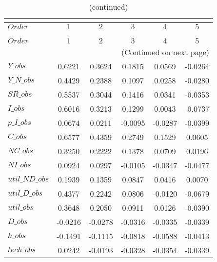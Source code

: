  
\begin{center}
\begin{longtable}{lccccc} 
\caption{COEFFICIENTS OF AUTOCORRELATION}\\
 \label{Table:th_autocorr_matrix}\\
\toprule 
$Order          $	 & 	 $          1$	 & 	 $          2$	 & 	 $          3$	 & 	 $          4$	 & 	 $          5$\\
\midrule \endfirsthead 
\caption{(continued)}\\
 \toprule \\ 
$Order          $	 & 	 $          1$	 & 	 $          2$	 & 	 $          3$	 & 	 $          4$	 & 	 $          5$\\
\midrule \endhead 
\midrule \multicolumn{6}{r}{(Continued on next page)} \\ \bottomrule \endfoot 
\bottomrule \endlastfoot 
$Y\_obs         $	 & 	     0.6221	 & 	     0.3624	 & 	     0.1815	 & 	     0.0569	 & 	    -0.0264 \\ 
$Y\_N\_obs      $	 & 	     0.4429	 & 	     0.2388	 & 	     0.1097	 & 	     0.0258	 & 	    -0.0280 \\ 
$SR\_obs        $	 & 	     0.5537	 & 	     0.3044	 & 	     0.1416	 & 	     0.0341	 & 	    -0.0353 \\ 
$I\_obs         $	 & 	     0.6016	 & 	     0.3213	 & 	     0.1299	 & 	     0.0043	 & 	    -0.0737 \\ 
$p\_I\_obs      $	 & 	     0.0674	 & 	     0.0211	 & 	    -0.0095	 & 	    -0.0287	 & 	    -0.0399 \\ 
$C\_obs         $	 & 	     0.6577	 & 	     0.4359	 & 	     0.2749	 & 	     0.1529	 & 	     0.0605 \\ 
$NC\_obs        $	 & 	     0.3250	 & 	     0.2222	 & 	     0.1378	 & 	     0.0709	 & 	     0.0196 \\ 
$NI\_obs        $	 & 	     0.0924	 & 	     0.0297	 & 	    -0.0105	 & 	    -0.0347	 & 	    -0.0477 \\ 
$util\_ND\_obs  $	 & 	     0.1939	 & 	     0.1359	 & 	     0.0847	 & 	     0.0416	 & 	     0.0070 \\ 
$util\_D\_obs   $	 & 	     0.4377	 & 	     0.2242	 & 	     0.0806	 & 	    -0.0120	 & 	    -0.0679 \\ 
$util\_obs      $	 & 	     0.3648	 & 	     0.2050	 & 	     0.0911	 & 	     0.0126	 & 	    -0.0390 \\ 
$D\_obs         $	 & 	    -0.0216	 & 	    -0.0278	 & 	    -0.0316	 & 	    -0.0335	 & 	    -0.0339 \\ 
$h\_obs         $	 & 	    -0.1491	 & 	    -0.1115	 & 	    -0.0818	 & 	    -0.0588	 & 	    -0.0413 \\ 
$tech\_obs      $	 & 	     0.0242	 & 	    -0.0193	 & 	    -0.0328	 & 	    -0.0354	 & 	    -0.0339 \\ 
\end{longtable}
 \end{center}
